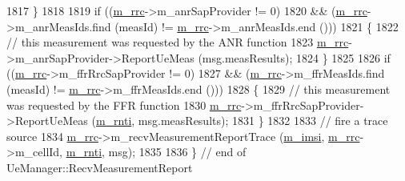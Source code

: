 \begin{DoxyCode}
1817     \}
1818 
1819   \textcolor{keywordflow}{if} ((\hyperlink{classns3_1_1UeManager_ab4405e9f354c66e7c1a4c95832290f5b}{m\_rrc}->m\_anrSapProvider != 0)
1820       && (\hyperlink{classns3_1_1UeManager_ab4405e9f354c66e7c1a4c95832290f5b}{m\_rrc}->m\_anrMeasIds.find (measId) != \hyperlink{classns3_1_1UeManager_ab4405e9f354c66e7c1a4c95832290f5b}{m\_rrc}->m\_anrMeasIds.end ()))
1821     \{
1822       \textcolor{comment}{// this measurement was requested by the ANR function}
1823       \hyperlink{classns3_1_1UeManager_ab4405e9f354c66e7c1a4c95832290f5b}{m\_rrc}->m\_anrSapProvider->ReportUeMeas (msg.measResults);
1824     \}
1825 
1826   \textcolor{keywordflow}{if} ((\hyperlink{classns3_1_1UeManager_ab4405e9f354c66e7c1a4c95832290f5b}{m\_rrc}->m\_ffrRrcSapProvider != 0)
1827       && (\hyperlink{classns3_1_1UeManager_ab4405e9f354c66e7c1a4c95832290f5b}{m\_rrc}->m\_ffrMeasIds.find (measId) != \hyperlink{classns3_1_1UeManager_ab4405e9f354c66e7c1a4c95832290f5b}{m\_rrc}->m\_ffrMeasIds.end ()))
1828     \{
1829       \textcolor{comment}{// this measurement was requested by the FFR function}
1830       \hyperlink{classns3_1_1UeManager_ab4405e9f354c66e7c1a4c95832290f5b}{m\_rrc}->m\_ffrRrcSapProvider->ReportUeMeas (\hyperlink{classns3_1_1UeManager_a5a72b4fe818f21993bd7f05d7e2c4f83}{m\_rnti}, msg.measResults);
1831     \}
1832 
1833   \textcolor{comment}{// fire a trace source}
1834   \hyperlink{classns3_1_1UeManager_ab4405e9f354c66e7c1a4c95832290f5b}{m\_rrc}->m\_recvMeasurementReportTrace (\hyperlink{classns3_1_1UeManager_a868dda076ecfc1d4202e357c16223d84}{m\_imsi}, \hyperlink{classns3_1_1UeManager_ab4405e9f354c66e7c1a4c95832290f5b}{m\_rrc}->m\_cellId, 
      \hyperlink{classns3_1_1UeManager_a5a72b4fe818f21993bd7f05d7e2c4f83}{m\_rnti}, msg);
1835 
1836 \} \textcolor{comment}{// end of UeManager::RecvMeasurementReport}
\end{DoxyCode}
